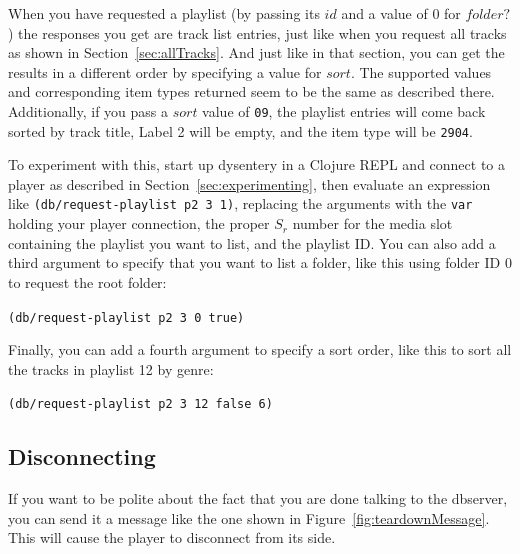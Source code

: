 \documentclass[11pt]{article}
\begin{document}
When you have requested a playlist (by passing its $id$ and a value of
0 for $folder?$) the responses you get are track list entries, just
like when you request all tracks as shown in
Section~\ref{sec:allTracks}. And just like in that section, you can
get the results in a different order by specifying a value for $sort$.
The supported values and corresponding item types returned seem to be
the same as described there. Additionally, if you pass a $sort$ value
of {\tt 09}, the playlist entries will come back sorted by track
title, Label 2 will be empty, and the item type will be {\tt 2904}.

\pagebreak

To experiment with this, start up dysentery in a Clojure REPL and
connect to a player as described in Section~\ref{sec:experimenting},
then evaluate an expression like {\tt (db/request-playlist p2 3 1)},
replacing the arguments with the {\tt var} holding your player
connection, the proper $S_r$ number for the media slot containing the
playlist you want to list, and the playlist ID. You can also add a
third argument to specify that you want to list a folder, like this
using folder ID 0 to request the root folder:

{\tt (db/request-playlist p2 3 0 true)}

Finally, you can add a fourth argument to specify a sort order, like
this to sort all the tracks in playlist 12 by genre:

{\tt (db/request-playlist p2 3 12 false 6)}

\subsection{Disconnecting}

If you want to be polite about the fact that you are done talking to
the dbserver, you can send it a message like the one shown in
Figure~\ref{fig:teardownMessage}. This will cause the player to
disconnect from its side.
\end{document}
